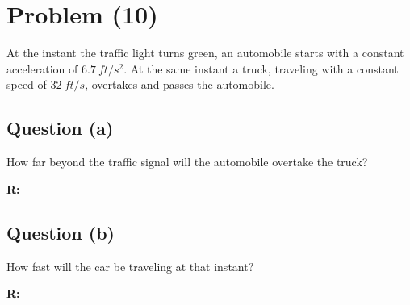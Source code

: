\section{Problem (10)}
	At the instant the traffic light turns green, an automobile starts with a constant acceleration of $6.7 \ ft/s^{2}$. At the same instant a truck, traveling with a constant speed of $32 \ ft/s$, overtakes and passes the automobile.

	\subsection{Question (a)}
		How far beyond the traffic signal will the automobile overtake the truck?

		\textbf{R:} \newline

	\subsection{Question (b)}
		How fast will the car be traveling at that instant?

		\textbf{R:} \newline
